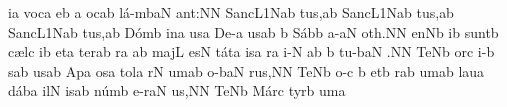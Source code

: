 \sgn {}i{}\punctum a\egn
\spatium
\sgn voc\punctum a\egn
\sgn {}e{}\punctum b\egn
\spatium
\custos a
\lineaproxima
{}oc\pes ab\egn
\sgn l{\'a}{-m}\climacus baN\egn
\sgn {}a{nt:}\punctum N\augmentum N\egn
\spatium
\divisiofinalis
\spatium
\sgn Sa{nc}\episem L1\Salicus Nab\egn
\sgn tu{s,}\punctum a\augmentum b\egn
\spatium
\divisiofinalis
\spatium
\sgn Sa{nc}\episem L1\Salicus Nab\egn
\sgn tu{s,}\punctum a\augmentum b\egn
\spatium
\divisiofinalis
\spatium
\sgn Sa{nc}\episem L1\Salicus Nab\egn
\sgn tu{s,}\punctum a\augmentum b\egn
\spatium
\divisiominor
\spatium
\sgn D{\'o}m\punctum b\egn
\sgn {}in\punctum a\egn
\sgn {}us\punctum a\egn
\spatium
\sgn De-\punctum a\egn
\sgn {}us\pes ab\egn
\spatium
\custos b
\lineaproxima
\sgn S{\'a}b\punctum b\egn
\sgn {}a-\clivis aN\egn
\sgn {}o{th.}\punctum N\augmentum N\egn
\spatium
\divisiofinalis
\spatium
{}en\pes Nb\egn
\sgn {}i{}\punctum b\egn
\spatium
\sgn su{nt}\punctum b\egn
\spatium
\sgn c{\ae}l\punctum c\egn
\sgn {}i{}\punctum b\egn
\spatium
\sgn {}et\punctum a\egn
\spatium
\sgn ter\pes ab\egn
\sgn ra{}%
\punctum a\augmentum b\egn
\spatium
\divisiominor
\spatium
\sgn maj\punctum L\egn
\sgn {}es\punctum N\egn
\sgn t{\'a}t\punctum a\egn
\sgn {}is\punctum a\egn
\spatium
{}r\punctum a\egn
\sgn {}i-\punctum N\egn
\sgn {}{\ae}{}\pes ab\egn
\spatium
\custos b
\lineaproxima
\sgn tu-\climacus baN\egn
\sgn {}{\ae}.\punctum N\augmentum N\egn
\spatium
\divisiofinalis
\spatium
\sgn Te{}\pes Nb\egn
\spatium
{}or\punctum c\egn
\sgn {}i-\punctum b\egn
{}s\pes ab\egn
\sgn {}us\punctum a\augmentum b\egn
\spatium
\sgn {}Ap\punctum a\egn
\sgn {}os\punctum a\egn
\sgn tol\punctum a\egn
{}r\punctum N\egn
\sgn {}um\pes ab\egn
\spatium
{}o-\climacus baN\egn
\sgn ru{s,}\punctum N\augmentum N\egn
\spatium
\divisiofinalis
\spatium
\sgn Te{}\pes Nb\egn
\spatium
{}o-\engl{}\punctum c\egn
\custos b
\lineaproxima
{}et\punctum b\egn
{}r\pes ab\egn
\sgn {}um\punctum a\augmentum b\egn
\spatium
\sgn lau\punctum a\egn
\sgn d{\'a}b\punctum a\egn
\sgn {}il\punctum N\egn
\sgn {}is\pes ab\egn
\spatium
\sgn n{\'u}m\punctum b\egn
\sgn {}e{-r}\clivis aN\egn
\sgn {}u{s,}\punctum N\augmentum N\egn
\spatium
\divisiofinalis
\spatium
\sgn Te{}\pes Nb\egn
\spatium
\sgn M{\'a}r\punctum c\egn
\sgn tyr\punctum b\egn
\sgn {}um\punctum a\egn
